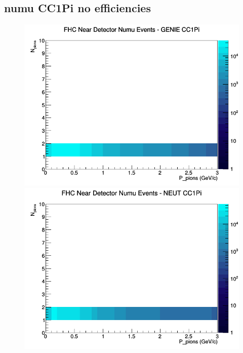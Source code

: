 \documentclass[12pt]{article}
\begin{document}
\subsection{numu CC1Pi no efficiencies}
\begin{figure}[h]
\includegraphics[width=\linewidth]{N_P/nominal/pions/CC1Pi_FHC_ND_numu_N_P_GENIE.png}
\endminipage
{}
\includegraphics[width=\linewidth]{N_P/nominal/pions/CC1Pi_FHC_ND_numu_N_P_NEUT.png}
\endminipage
{}

\end{figure}
\end{document}
